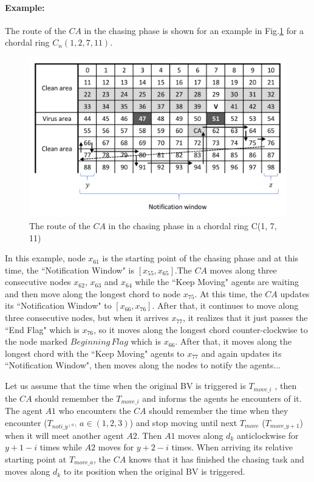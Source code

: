 \paragraph {\bf Example:} 
The route of the $CA$ in the chasing phase is shown for an example in Fig.\ref{fig:chasing} for a  chordal ring $C_n(1, 2, 7, 11)$. 
\begin{figure}[H]
  \centering  
  \includegraphics[width=1.0\textwidth]{figures/chasing.png}
  \caption{The route of the $CA$ in the chasing phase in a chordal ring C(1, 7, 11)}\label{fig:chasing}
\end{figure}
In this example, node $x_{61}$ is the starting point of the chasing phase and at this time, the ``Notification Window" is $[x_{55}, x_{65}]$.The $CA$ moves along three consecutive nodes $x_{62}$, $x_{63}$ and $x_{64}$ while the ``Keep Moving" agents are waiting and then move along the longest chord to node $x_{75}$. At this time, the $CA$ updates its ``Notification Window" to $[x_{66}, x_{76}]$. After that, it continues to move along three consecutive nodes, but when it arrives $x_{77}$, it realizes that it just passes the ``End Flag" which is $x_{76}$, so it moves along the longest chord  counter-clockwise to the node marked   $Beginning\,Flag$ which is $x_{66}$. After that, it moves along the longest chord with the ``Keep Moving" agents to $x_{77}$ and again updates its ``Notification Window", then moves along the nodes to notify the agents...

Let us assume that the time when the original BV is triggered is $T_{move\_i}$ , then the $CA$ should remember the $T_{move\_i}$ and informs the agents he encounters of it. The agent $A1$ who encounters the $CA$ should remember the time when they encounter ($T_{noti\_y^{(a)}}\,a\in(1,2,3)$) and stop moving until next $T_{move}$ ($T_{move\_{y+1}}$) when it will meet another agent $A2$. Then $A1$ moves along $d_k$ anticlockwise for $y+1-i$ times while $A2$ moves for $y+2-i$ times. 
When arriving its relative starting point at $T_{move\_a}$, the $CA$ knows that it has finished the chasing task and moves along $d_k$ to its position when the original BV is triggered.



